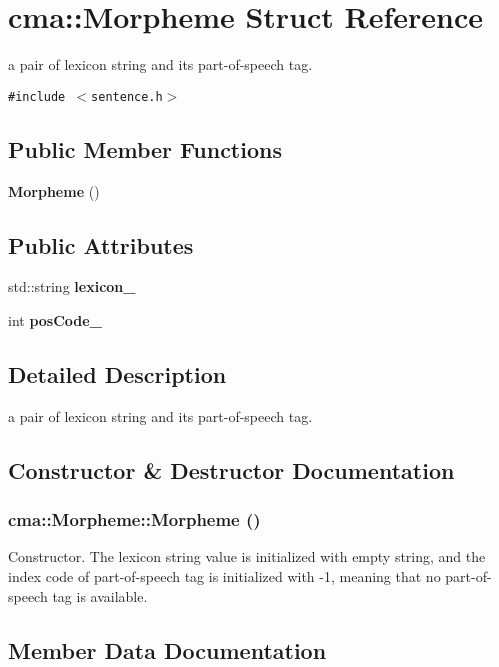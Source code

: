 \section{cma::Morpheme Struct Reference}
\label{structcma_1_1Morpheme}
a pair of lexicon string and its part-of-speech tag.  


{\tt \#include $<$sentence.h$>$}

\subsection*{Public Member Functions}
\begin{CompactItemize}
\item 
{\bf Morpheme} ()
\end{CompactItemize}
\subsection*{Public Attributes}
\begin{CompactItemize}
\item 
std::string {\bf lexicon\_\-}
\item 
int {\bf posCode\_\-}
\end{CompactItemize}


\subsection{Detailed Description}
a pair of lexicon string and its part-of-speech tag. 

\subsection{Constructor \& Destructor Documentation}
\subsubsection{\setlength{\rightskip}{0pt plus 5cm}cma::Morpheme::Morpheme ()}\label{structcma_1_1Morpheme_79ab5404cd959f89daadb8a7714334cb}


Constructor. The lexicon string value is initialized with empty string, and the index code of part-of-speech tag is initialized with -1, meaning that no part-of-speech tag is available. 

\subsection{Member Data Documentation}
